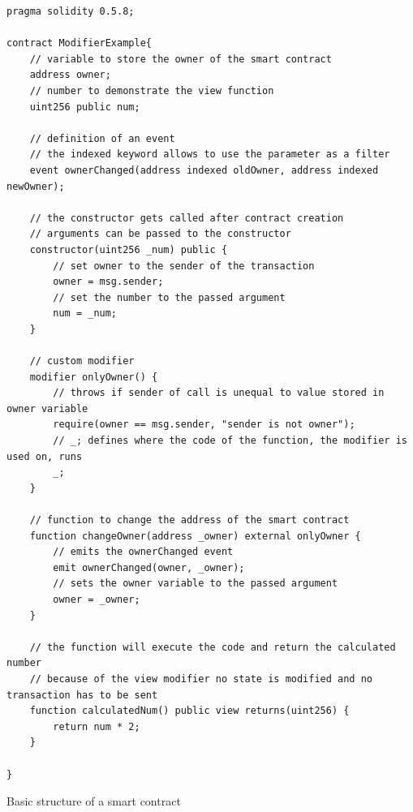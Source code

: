\begin{listing}[H]
\begin{verbatim}
pragma solidity 0.5.8;

contract ModifierExample{
    // variable to store the owner of the smart contract
    address owner;
    // number to demonstrate the view function
    uint256 public num;
    
    // definition of an event
    // the indexed keyword allows to use the parameter as a filter
    event ownerChanged(address indexed oldOwner, address indexed newOwner);
    
    // the constructor gets called after contract creation
    // arguments can be passed to the constructor
    constructor(uint256 _num) public {
        // set owner to the sender of the transaction
        owner = msg.sender;
        // set the number to the passed argument
        num = _num;
    }
    
    // custom modifier
    modifier onlyOwner() {
        // throws if sender of call is unequal to value stored in owner variable
        require(owner == msg.sender, "sender is not owner");
        // _; defines where the code of the function, the modifier is used on, runs
        _;
    }
    
    // function to change the address of the smart contract
    function changeOwner(address _owner) external onlyOwner {
        // emits the ownerChanged event
        emit ownerChanged(owner, _owner);
        // sets the owner variable to the passed argument
        owner = _owner;
    }
    
    // the function will execute the code and return the calculated number
    // because of the view modifier no state is modified and no transaction has to be sent
    function calculatedNum() public view returns(uint256) {
        return num * 2;
    }
    
}
\end{verbatim}
\caption{Basic structure of a smart contract}
\label{lis:sc_basic_ref}
\end{listing}


